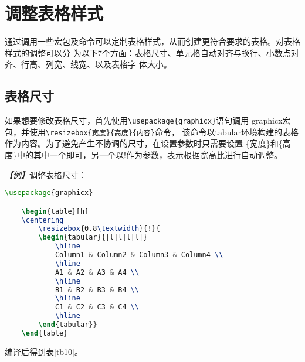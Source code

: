 \section{调整表格样式}

通过调用一些宏包及命令可以定制表格样式，从而创建更符合要求的表格。对表格样式的调整可以分
为以下7个方面：表格尺寸、单元格自动对齐与换行、小数点对齐、行高、列宽、线宽、以及表格字
体大小。

\subsection{表格尺寸}
如果想要修改表格尺寸，首先使用\texttt{\textbackslash{}usepackage\{graphicx\}}语句调用
\textmd{graphicx}宏包，并使用\texttt{\textbackslash{}resizebox\{宽度\}\{高度\}\{内容\}}命令，
该命令以tabular环境构建的表格作为内容。为了避免产生不协调的尺寸，在设置参数时只需要设置
\{宽度\}和\{高度\}中的其中一个即可，另一个以!作为参数，表示根据宽高比进行自动调整。

\emph{【例】}调整表格尺寸：
\begin{lstlisting}[language=TeX]
    \usepackage{graphicx}

    \begin{table}[h]
    \centering
        \resizebox{0.8\textwidth}{!}{
        \begin{tabular}{|l|l|l|l|}
            \hline
            Column1 & Column2 & Column3 & Column4 \\
            \hline
            A1 & A2 & A3 & A4 \\
            \hline
            B1 & B2 & B3 & B4 \\
            \hline
            C1 & C2 & C3 & C4 \\
            \hline
        \end{tabular}}
    \end{table}
\end{lstlisting}

编译后得到表\ref{tb10}。

\begin{table}[h]
    \centering
    \caption{调整表格尺寸=0.8}
    \label{tb10}
\end{table}


